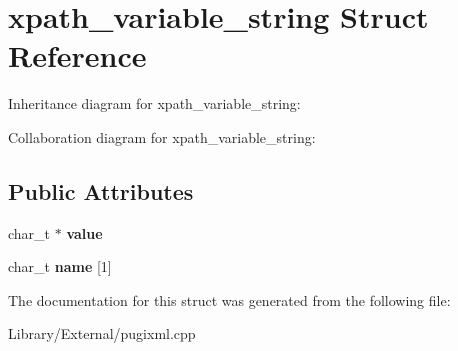 \hypertarget{structxpath__variable__string}{}\section{xpath\+\_\+variable\+\_\+string Struct Reference}
\label{structxpath__variable__string}


Inheritance diagram for xpath\+\_\+variable\+\_\+string\+:


Collaboration diagram for xpath\+\_\+variable\+\_\+string\+:
\subsection*{Public Attributes}
\begin{DoxyCompactItemize}
\item 
\hypertarget{structxpath__variable__string_aeb8a87a8457d2615cd7b766fd3f30559}{}char\+\_\+t $\ast$ {\bfseries value}\label{structxpath__variable__string_aeb8a87a8457d2615cd7b766fd3f30559}

\item 
\hypertarget{structxpath__variable__string_a5c43cdcc55a620db0e7bdd29b4d56e89}{}char\+\_\+t {\bfseries name} \mbox{[}1\mbox{]}\label{structxpath__variable__string_a5c43cdcc55a620db0e7bdd29b4d56e89}

\end{DoxyCompactItemize}


The documentation for this struct was generated from the following file\+:\begin{DoxyCompactItemize}
\item 
Library/\+External/pugixml.\+cpp\end{DoxyCompactItemize}
